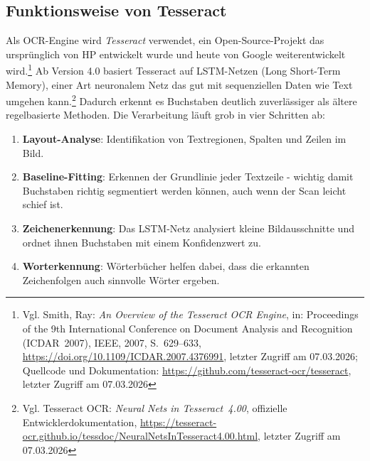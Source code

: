 \subsection{Funktionsweise von Tesseract}
Als OCR-Engine wird \textit{Tesseract} verwendet, ein Open-Source-Projekt das ursprünglich von HP entwickelt wurde und heute von Google weiterentwickelt wird.\footnote{Vgl. Smith, Ray: \textit{An Overview of the Tesseract OCR Engine}, in: Proceedings of the 9th International Conference on Document Analysis and Recognition (ICDAR~2007), IEEE, 2007, S.~629--633, \url{https://doi.org/10.1109/ICDAR.2007.4376991}, letzter Zugriff am 07.03.2026; Quellcode und Dokumentation: \url{https://github.com/tesseract-ocr/tesseract}, letzter Zugriff am 07.03.2026} Ab Version 4.0 basiert Tesseract auf LSTM-Netzen (Long Short-Term Memory), einer Art neuronalem Netz das gut mit sequenziellen Daten wie Text umgehen kann.\footnote{Vgl. Tesseract OCR: \textit{Neural Nets in Tesseract~4.00}, offizielle Entwicklerdokumentation, \url{https://tesseract-ocr.github.io/tessdoc/NeuralNetsInTesseract4.00.html}, letzter Zugriff am 07.03.2026} Dadurch erkennt es Buchstaben deutlich zuverlässiger als ältere regelbasierte Methoden.
Die Verarbeitung läuft grob in vier Schritten ab:
\begin{enumerate}
    \item \textbf{Layout-Analyse}: Identifikation von Textregionen, Spalten und Zeilen im Bild.
    \item \textbf{Baseline-Fitting}: Erkennen der Grundlinie jeder Textzeile - wichtig damit Buchstaben richtig segmentiert werden können, auch wenn der Scan leicht schief ist.
    \item \textbf{Zeichenerkennung}: Das LSTM-Netz analysiert kleine Bildausschnitte und ordnet ihnen Buchstaben mit einem Konfidenzwert zu.
    \item \textbf{Worterkennung}: Wörterbücher helfen dabei, dass die erkannten Zeichenfolgen auch sinnvolle Wörter ergeben.
\end{enumerate}


